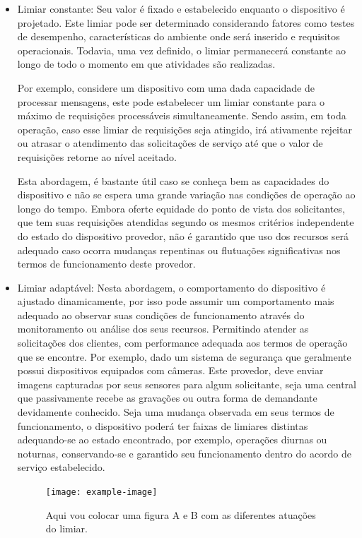 \begin{itemize}
    \item Limiar constante: Seu valor é fixado e estabelecido enquanto o dispositivo é projetado. Este limiar pode ser determinado considerando fatores como testes de desempenho, características do ambiente onde será inserido e requisitos operacionais. Todavia, uma vez definido, o limiar permanecerá constante ao longo de todo o momento em que  atividades são realizadas.
    
    Por exemplo, considere um dispositivo com uma dada capacidade de processar mensagens, este pode estabelecer um limiar constante para o máximo de requisições processáveis simultaneamente. Sendo assim, em toda operação, caso esse limiar de requisições seja atingido, irá ativamente rejeitar ou atrasar o atendimento das solicitações de serviço até que o valor de requisições retorne ao nível aceitado. 
    
    Esta abordagem, é bastante útil caso se conheça bem as capacidades do dispositivo e não se espera uma grande variação nas condições de operação ao longo do tempo. Embora oferte equidade do ponto de vista dos solicitantes, que tem suas requisições atendidas segundo os mesmos critérios independente do estado do dispositivo provedor, não é garantido que uso dos recursos será adequado caso ocorra mudanças repentinas ou flutuações significativas nos termos de funcionamento deste provedor.
    
    \item Limiar adaptável: Nesta abordagem, o comportamento do dispositivo é ajustado dinamicamente, por isso pode assumir um comportamento mais adequado ao observar suas condições de funcionamento através do monitoramento ou análise dos seus recursos. Permitindo atender as solicitações dos clientes, com performance adequada aos termos de operação que se encontre. Por exemplo, dado um sistema de segurança que geralmente possui dispositivos equipados com câmeras. Este provedor, deve enviar imagens capturadas por seus sensores para algum solicitante, seja uma central que passivamente recebe as gravações ou outra forma de demandante devidamente conhecido. Seja uma mudança observada em seus termos de funcionamento, o dispositivo poderá ter faixas de limiares distintas adequando-se ao estado encontrado, por exemplo, operações diurnas ou noturnas, conservando-se e garantido seu funcionamento dentro do acordo de serviço estabelecido.   
    
    \begin{figure}[h]
    	\centering
    	\texttt{[image: example-image]} 
    	\caption{Aqui vou colocar uma figura A e B com as diferentes atuações do limiar.}
    \end{figure}
    
    
\end{itemize}

